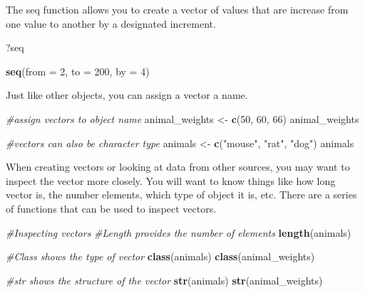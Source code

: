 \documentclass[]{article}
\newenvironment{Shaded}{\begin{snugshade}}{\end{snugshade}}
\newcommand{\KeywordTok}[1]{\textcolor[rgb]{0.13,0.29,0.53}{\textbf{{#1}}}}
\newcommand{\DataTypeTok}[1]{\textcolor[rgb]{0.13,0.29,0.53}{{#1}}}
\newcommand{\DecValTok}[1]{\textcolor[rgb]{0.00,0.00,0.81}{{#1}}}
\newcommand{\StringTok}[1]{\textcolor[rgb]{0.31,0.60,0.02}{{#1}}}
\newcommand{\CommentTok}[1]{\textcolor[rgb]{0.56,0.35,0.01}{\textit{{#1}}}}
\newcommand{\NormalTok}[1]{{#1}}
\begin{document}
The seq function allows you to create a vector of values that are
increase from one value to another by a designated increment.

\begin{Shaded}
\begin{Highlighting}[]
\NormalTok{?seq}

\KeywordTok{seq}\NormalTok{(}\DataTypeTok{from =} \DecValTok{2}\NormalTok{, }\DataTypeTok{to =} \DecValTok{200}\NormalTok{, }\DataTypeTok{by =} \DecValTok{4}\NormalTok{)}
\end{Highlighting}
\end{Shaded}

Just like other objects, you can assign a vector a name.

\begin{Shaded}
\begin{Highlighting}[]
\CommentTok{#assign vectors to object name}
\NormalTok{animal_weights <-}\StringTok{ }\KeywordTok{c}\NormalTok{(}\DecValTok{50}\NormalTok{, }\DecValTok{60}\NormalTok{, }\DecValTok{66}\NormalTok{)}
\NormalTok{animal_weights}

\CommentTok{#vectors can also be character type}
\NormalTok{animals <-}\StringTok{ }\KeywordTok{c}\NormalTok{(}\StringTok{"mouse"}\NormalTok{, }\StringTok{"rat"}\NormalTok{, }\StringTok{"dog"}\NormalTok{)}
\NormalTok{animals}
\end{Highlighting}
\end{Shaded}

When creating vectors or looking at data from other sources, you may
want to inspect the vector more closely. You will want to know things
like how long vector is, the number elements, which type of object it
is, etc. There are a series of functions that can be used to inspect
vectors.

\begin{Shaded}
\begin{Highlighting}[]
\CommentTok{#Inspecting vectors}
\CommentTok{#Length provides the number of elements}
\KeywordTok{length}\NormalTok{(animals)}

\CommentTok{#Class shows the type of vector}
\KeywordTok{class}\NormalTok{(animals)}
\KeywordTok{class}\NormalTok{(animal_weights)}

\CommentTok{#str shows the structure of the vector}
\KeywordTok{str}\NormalTok{(animals)}
\KeywordTok{str}\NormalTok{(animal_weights)}
\end{Highlighting}
\end{Shaded}
\end{document}
